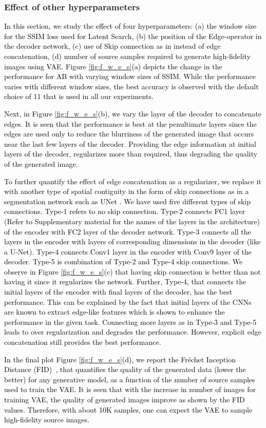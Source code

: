 \documentclass[journal,twoside,web]{IEEEtran}
\renewcommand{\textrightarrow}{}
\newcommand{\bb}{\textcolor{black}}
\begin{document}
\subsubsection{Effect of other hyperparameters} \bb{In this section, we study the effect of four hyperparameters: (a) the window size for the SSIM loss used for Latent Search, (b) the position of the Edge-operator in the decoder network, (c) use of Skip connection as in \cite{unet} instead of edge concatenation, (d) number of source samples required to generate high-fidelity images using VAE. Figure \ref{fig:f_w_e_s}(a) depicts the change in the performance for A\textrightarrow B with varying window sizes of SSIM. While the performance varies with different window sizes, the best accuracy is observed with the default choice of 11 that is used in all our experiments.}\par \bb{Next, in Figure \ref{fig:f_w_e_s}(b), we vary the layer of the decoder to concatenate edges. It is seen that the performance is best at the penultimate layers since the edges are used only to reduce the blurriness of the generated image that occurs near the last few layers of the decoder. Providing the edge information at initial layers of the decoder, regularizes more than required, thus degrading the quality of the generated image.} \par \bb{To further quantify the effect of edge concatenation as a regularizer, we replace it with another type of spatial contiguity in the form of skip connections as in a segmentation network such as UNet \cite{unet}.  We have used five different types of skip connections. Type-1 refers to no skip connection. Type-2 connects FC1 layer (Refer to Supplementary material for the names of the layers in the architecture) of the encoder with FC2 layer of the decoder network. Type-3 connects all the layers in the encoder with layers of corresponding dimensions in the decoder (like a U-Net). Type-4 connects Conv1 layer in the encoder with Conv9 layer of the decoder. Type-5 is combination of Type-2 and Type-4 skip connections. We observe in Figure \ref{fig:f_w_e_s}(c) that having skip connection is better than not having it since it regularizes the network. Further, Type-4, that connects the initial layers of the encoder with final layers of the decoder, has the best performance. This can be explained by the fact that initial layers of the CNNs are known to extract edge-like features which is shown to enhance the performance in the given task. Connecting more layers as in Type-3 and Type-5 leads to over regularization and degrades the performance. However, explicit edge concatenation still provides the best performance.} \par \bb{In the final plot Figure \ref{fig:f_w_e_s}(d), we report the Fréchet Inception Distance (FID)~\cite{heusel2017gans}, that quantifies the quality of the generated data (lower the better) for any generative model, as a function of the number of source samples used to train the VAE. It is seen that with the increase in number of images for training VAE, the quality of generated images improve as shown by the FID values. Therefore, with about 10K samples, one can expect the VAE to sample high-fidelity source images.}
\end{document}
